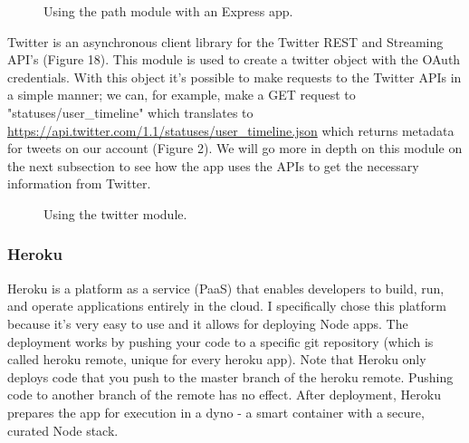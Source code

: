 \documentclass[12pt]{article} %
\begin{document}
	\begin{figure}[H] %
	\caption{Using the path module with an Express app.}
	\label{pathStatic}
	\end{figure}

	\noindent Twitter \cite{twitter} is an asynchronous client library for the Twitter REST and Streaming API's (Figure 18).
	This module is used to create a twitter object with the OAuth credentials. With this object it's possible to make requests to the Twitter APIs in a simple manner; we can, for example,
	make a GET request to "statuses/user\_timeline" which translates to \url{https://api.twitter.com/1.1/statuses/user\_timeline.json} which returns metadata for tweets on our 			account (Figure 2).
	We will go more in depth on this module on the next subsection to see how the app uses the APIs to get the necessary information from Twitter.

	\begin{figure}[H] %
	\caption{Using the twitter module.}
	\label{twitter}
	\end{figure}

	 \subsubsection{Heroku \cite{heroku}}  Heroku is a platform as a service (PaaS) that enables developers to build, run, and operate applications entirely in the cloud.
	I specifically chose this platform because it's very easy to use and it allows for deploying Node apps.
	The deployment \cite{herokudeploy} works by pushing your code to a specific git repository (which is called heroku remote, unique for every heroku app). 
	Note that Heroku only deploys code that you push to the master branch of the heroku remote. Pushing code to another branch of the remote has no effect. After deployment, 			Heroku prepares the app for execution in a dyno - a smart container with a secure, curated Node stack.	
\end{document}
